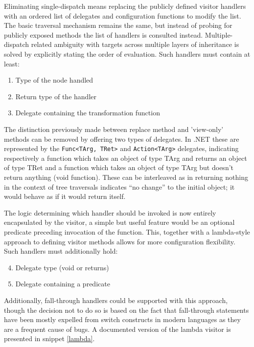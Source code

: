 \documentclass[twoside,openright]{uva-bachelor-thesis}
\newcommand{\code}[1]{\texttt{\footnotesize#1}}
\begin{document}
			Eliminating single-dispatch means replacing the publicly defined visitor handlers with an ordered list of delegates and configuration functions to modify the list. The basic traversal mechanism remains the same, but instead of probing for publicly exposed methods the list of handlers is consulted instead. Multiple-dispatch related ambiguity with targets across multiple layers of inheritance is solved by explicitly stating the order of evaluation. Such handlers must contain at least:
			\begin{enumerate}
				\item Type of the node handled
				\item Return type of the handler
				\item Delegate containing the transformation function
			\end{enumerate}
			
			The distinction previously made between replace method and 'view-only' methods can be removed by offering two types of delegates. In .NET these are represented by the \code{Func<TArg, TRet>} and \code{Action<TArg>}  delegates, indicating respectively a function which takes an object of type TArg and returns an object of type TRet and a function which takes an object of type TArg but doesn't return anything (void function). These can be interleaved as in returning nothing in the context of tree traversals indicates ``no change'' to the initial object; it would behave as if it would return itself.
			
			The logic determining which handler should be invoked is now entirely encapsulated by the visitor, a simple but useful feature would be an optional predicate preceding invocation of the function. This, together with a lambda-style approach to defining visitor methods allows for more configuration flexibility. Such handlers must additionally hold:
			\begin{enumerate}
				\setcounter{enumi}{3}
				\item Delegate type (void or returns)
				\item Delegate containing a predicate
			\end{enumerate}
						
			Additionally, fall-through handlers could be supported with this approach, though the decision not to do so is based on the fact that fall-through statements have been mostly expelled from switch constructs in modern languages as they are a frequent cause of bugs. A documented version of the lambda visitor is presented in snippet \ref{lambda}.
			
\end{document}
